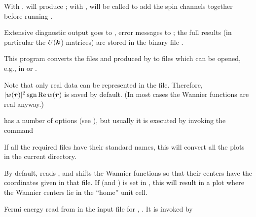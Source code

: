With , \wannierx will produce ; with
, \wiiwaddsp will be called to add the spin channels
together before running \wannierx.

Extensive diagnostic output goes to , error messages
to ; the full results (in particular the $U(\boldsymbol k$)
matrices) are stored in the binary file .



This program converts the files  and
 produced by \wplot to files
 which can be opened, e.g., in
\xcrys \cite{xcrys} or \vesta \cite{vesta}.

Note that only real data can be represented in the  file.
Therefore, $|w(\boldsymbol r)|^2 \operatorname{sgn} \mathop{\operatorname{Re}} w(\boldsymbol r)$ is saved by default.  (In
most cases the Wannier functions are real anyway.)

 has a number of options (see ),
but usually it is executed by invoking the command
%
\begin{usage}
  \wplottoxsf [-up|-dn]
\end{usage}
%
If all the required files have their standard names, this will convert
all the plots in the current directory.

By default,  reads , and
shifts the Wannier functions so that their centers have the
coordinates given in that file.  If  (and
) is set in , this will result in a
plot where the Wannier centers lie in the ``home'' unit cell.



Fermi energy read from  in the input file for
, . It is invoked by
%
\begin{usage}
  \writeinsp [-up/-dn]
\end{usage}



